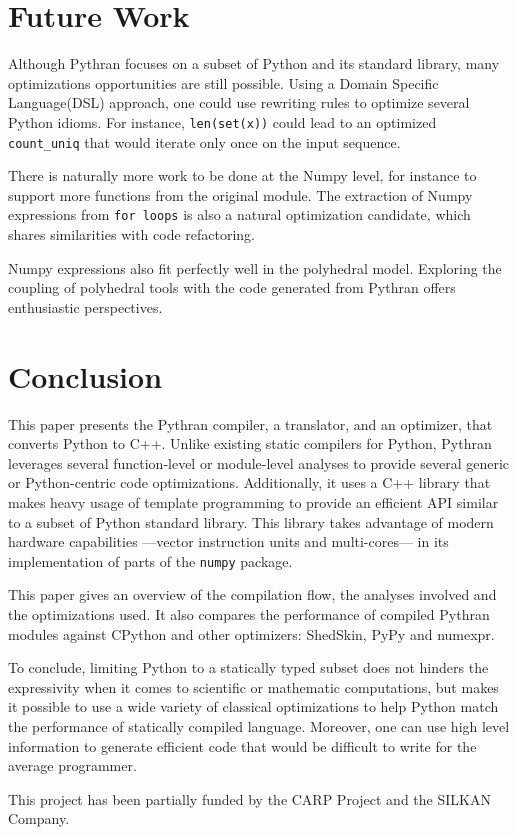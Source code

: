 \documentclass[10pt, onecolumn, preprint]{sigplanconf}
\begin{document}
\section{Future Work}

Although Pythran focuses on a subset of Python and its standard library, many
optimizations opportunities are still possible. Using a Domain Specific
Language(DSL) approach, one could use rewriting rules to optimize several
Python idioms. For instance, \texttt{len(set(x))} could lead to an optimized
\texttt{count\_uniq} that would iterate only once on the input sequence.

There is naturally more work to be done at the Numpy level, for instance to
support more functions from the original module. The extraction of Numpy
expressions from \texttt{for loops} is also a natural optimization candidate, which
shares similarities with code refactoring.

Numpy expressions also fit perfectly well in the polyhedral model. Exploring
the coupling of polyhedral tools with the code generated from Pythran offers
enthusiastic perspectives.

\section{Conclusion}

This paper presents the Pythran compiler, a translator, and an optimizer, that
converts Python to C++. Unlike existing static compilers for Python, Pythran
leverages several function-level or module-level analyses to provide several
generic or Python-centric code optimizations. Additionally, it uses a C++
library that makes heavy usage of template programming to provide an efficient
API similar to a subset of Python standard library. This library takes
advantage of modern hardware capabilities ---vector instruction units and
multi-cores--- in its implementation of parts of the \texttt{numpy} package.

This paper gives an overview of the compilation flow, the analyses involved and
the optimizations used. It also compares the performance of compiled Pythran
modules against CPython and other optimizers: ShedSkin, PyPy and numexpr.

To conclude, limiting Python to a statically typed subset does not hinders the
expressivity when it comes to scientific or mathematic computations, but makes
it possible to use a wide variety of classical optimizations to help Python
match the performance of statically compiled language. Moreover, one can use
high level information to generate efficient code that would be difficult to write for the average programmer.

\acks

This project has been partially funded by the CARP Project and the SILKAN
Company.




\end{document}
